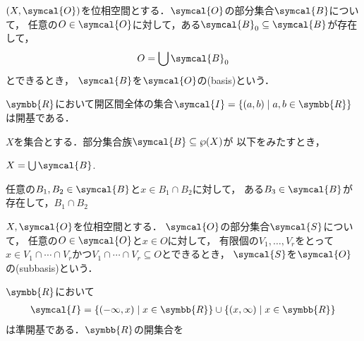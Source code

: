 \documentclass[../main.tex]{subfiles}
\begin{document}
\begin{thmbox}
\begin{definition}
\((X, \symcal{O})\)を位相空間とする．\(\symcal{O}\)の部分集合\(\symcal{B}\)について，
任意の\(O \in \symcal{O}\)に対して，ある\(\symcal{B}_0 \subseteq \symcal{B}\)が存在して，
\begin{align*}
    O = \bigcup \symcal{B}_0
\end{align*}
とできるとき，
\(\symcal{B}\)を\(\symcal{O}\)の(basis)という．
\end{definition}
\end{thmbox}

\begin{example} \(\symbb{R}\)において開区間全体の集合\(\symcal{I} = \{ (a, b) \mid a,  b \in \symbb{R}\}\)は開基である．
\end{example}

\begin{thmbox}
\begin{theorem}
\(X\)を集合とする．部分集合族\(\symcal{B} \subseteq \wp(X)\)が
以下をみたすとき，
\begin{conditions}
    \item \(X = \bigcup \symcal{B}\).
    \item 任意の\(B_1, B_2 \in \symcal{B}\)と\(x \in B_1 \cap B_2\)に対して，
        ある\(B_3 \in \symcal{B}\)が存在して，\(B_1 \cap B_2\)
\end{conditions}
\end{theorem}
\end{thmbox}

\begin{thmbox}
\begin{definition}
\(X, \symcal{O}\)を位相空間とする．
\(\symcal{O}\)の部分集合\(\symcal{S}\)について，
任意の\(O \in \symcal{O}\)と\(x \in O\)に対して，
有限個の\(V_1, \ldots, V_r \)をとって
\(x \in V_1 \cap \cdots \cap V_r\)かつ\(V_1 \cap \cdots \cap V_r \subseteq O\)とできるとき，
\(\symcal{S}\)を\(\symcal{O}\)の(subbasis)という．
\end{definition}
\end{thmbox}

\begin{example} \(\symbb{R}\)において
\begin{align*}
    \symcal{I} =
        \{ (-\infty, x) \mid x \in \symbb{R} \}
        \cup
        \{ (x, \infty) \mid x \in \symbb{R} \}
\end{align*}
は準開基である．\(\symbb{R}\)の開集合を
\end{example}
\end{document}
